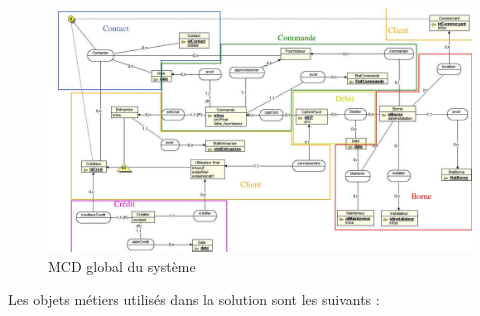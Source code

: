 \begin{landscape}
  \begin{figure}[ht]
      \centering
      \includegraphics[width=0.7\paperheight]{mcd}
      \caption{MCD global du système}
      \label{fig:mcd}
  \end{figure}
\end{landscape}

Les objets métiers utilisés dans la solution sont les suivants : \\

